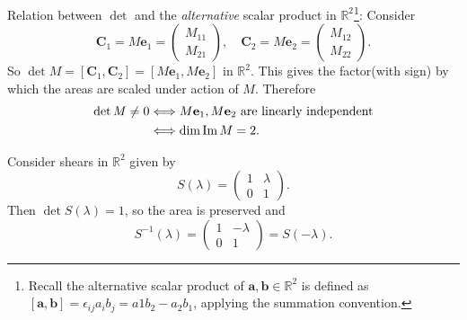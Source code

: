 \documentclass[a4paper]{article}
\begin{document}
    \begin{remark}
      Relation between $\det$ and the \textit{alternative} scalar
      product in $ \mathbb{R}^{2} $\footnote{Recall the alternative
        scalar product of $ \mathbf{a},\mathbf{b}\in \mathbb{R}^{2} $
        is defined as $
        [\mathbf{a},\mathbf{b}]=\epsilon_{ij}a_ib_j=a1b_2-a_2b_1 $,
      applying the summation convention.}: Consider
      \[
        \mathbf{C}_1=M \mathbf{e}_1=
        \begin{pmatrix}
          M_{11}\\M_{21}
        \end{pmatrix}, \quad \mathbf{C}_2=M \mathbf{e}_2=
        \begin{pmatrix}
          M_{12}\\M_{22}
        \end{pmatrix}
      .\]
      So $ \det M =[\mathbf{C}_1,\mathbf{C}_2]= [M \mathbf{e}_1,M
      \mathbf{e}_2] $ in $ \mathbb{R}^{2} $. This gives the
      factor(with sign) by which the areas are scaled under action of
      $M$. Therefore
      \[
        \begin{aligned}
          \det M\neq 0 & \Longleftrightarrow M \mathbf{e}_1, M
          \mathbf{e}_2 \text{ are linearly independent}\\
          &\Longleftrightarrow \dim \operatorname{Im} M=2.
        \end{aligned}
      \]
    \end{remark}
    \begin{example}
      Consider shears in $ \mathbb{R}^{2} $ given by
      \[
        S(\lambda)=
        \begin{pmatrix}
          1&\lambda\\
          0&1
        \end{pmatrix}
      .\]
      Then $ \det S(\lambda)=1 $, so the area is preserved and
      \[
        S^{-1}(\lambda)=
        \begin{pmatrix}
          1&-\lambda\\
          0&1
        \end{pmatrix}=S(-\lambda)
      .\]
    \end{example}
\end{document}
